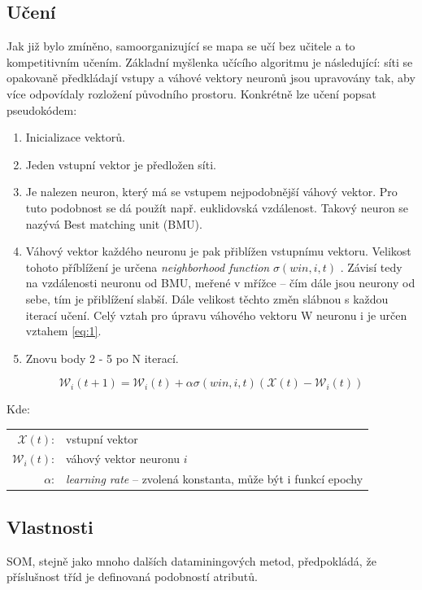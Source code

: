 \documentclass[thesis=M,czech]{FITthesis}[2012/06/26]
\begin{document}
\subsection{Učení}

Jak již bylo zmíněno, samoorganizující se mapa se učí bez učitele a to kompetitivním učením. Základní myšlenka učícího algoritmu je následující: síti se opakovaně předkládají vstupy a váhové vektory neuronů jsou upravovány tak, aby více odpovídaly rozložení původního prostoru.
Konkrétně lze učení popsat pseudokódem:

\begin{enumerate}
\item Inicializace vektorů.
\item Jeden vstupní vektor je předložen síti.
\item Je nalezen neuron, který má se vstupem nejpodobnější váhový vektor. Pro tuto podobnost se dá použít např. euklidovská vzdálenost. Takový neuron se nazývá Best matching unit (BMU).
\item Váhový vektor každého neuronu je pak přiblížen vstupnímu vektoru. Velikost tohoto příblížení je určena \textit{neighborhood function} $\sigma(win, i, t)$ .
Závisí tedy na vzdálenosti neuronu od BMU, meřené v mřížce -- čím dále jsou neurony od sebe, tím je přiblížení slabší. Dále velikost těchto změn slábnou s každou iterací učení. Celý vztah pro úpravu váhového vektoru W neuronu i je určen vztahem \ref{eq:1}.


\item Znovu body 2 - 5 po N iterací.
\end{enumerate}

\begin{equation} \label{eq:1}
    \mathcal{W}_i(t+1) = \mathcal{W}_i(t) + \alpha \sigma(win, i, t)(\mathcal{X}(t) - \mathcal{W}_i(t))    
\end{equation}

Kde:\\
\hspace*{3em}
\begin{tabular}{rl}
    $\mathcal{X}(t)$:& vstupní vektor \\
    $\mathcal{W}_i(t)$:& váhový vektor neuronu $i$ \\
    $\alpha$:& \textit{learning rate} -- zvolená konstanta, může být i funkcí epochy \\
\end{tabular}


\subsection{Vlastnosti}
SOM, stejně jako mnoho dalších dataminingových metod, předpokládá, že příslušnost tříd je definovaná podobností atributů.
\end{document}
